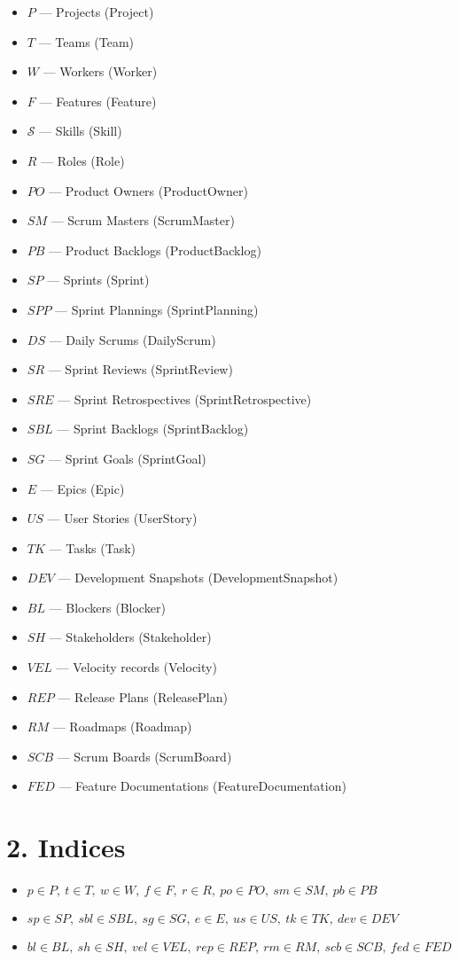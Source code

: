 \documentclass[11pt,a4paper]{article}
\begin{document}
\begin{itemize}
  \item $P$ — Projects (\textsf{Project})
  \item $T$ — Teams (\textsf{Team})
  \item $W$ — Workers (\textsf{Worker})
  \item $F$ — Features (\textsf{Feature})
  \item $\mathcal{S}$ — Skills (\textsf{Skill})
  \item $R$ — Roles (\textsf{Role})
  \item $PO$ — Product Owners (\textsf{ProductOwner})
  \item $SM$ — Scrum Masters (\textsf{ScrumMaster})
  \item $PB$ — Product Backlogs (\textsf{ProductBacklog})
  \item $SP$ — Sprints (\textsf{Sprint})
  \item $SPP$ — Sprint Plannings (\textsf{SprintPlanning})
  \item $DS$ — Daily Scrums (\textsf{DailyScrum})
  \item $SR$ — Sprint Reviews (\textsf{SprintReview})
  \item $SRE$ — Sprint Retrospectives (\textsf{SprintRetrospective})
  \item $SBL$ — Sprint Backlogs (\textsf{SprintBacklog})
  \item $SG$ — Sprint Goals (\textsf{SprintGoal})
  \item $E$ — Epics (\textsf{Epic})
  \item $US$ — User Stories (\textsf{UserStory})
  \item $TK$ — Tasks (\textsf{Task})
  \item $DEV$ — Development Snapshots (\textsf{DevelopmentSnapshot})
  \item $BL$ — Blockers (\textsf{Blocker})
  \item $SH$ — Stakeholders (\textsf{Stakeholder})
  \item $VEL$ — Velocity records (\textsf{Velocity})
  \item $REP$ — Release Plans (\textsf{ReleasePlan})
  \item $RM$ — Roadmaps (\textsf{Roadmap})
  \item $SCB$ — Scrum Boards (\textsf{ScrumBoard})
  \item $FED$ — Feature Documentations (\textsf{FeatureDocumentation})
\end{itemize}

\section{2. Indices}
\begin{itemize}
  \item $p\!\in\!P,\ t\!\in\!T,\ w\!\in\!W,\ f\!\in\!F,\ r\!\in\!R,\ po\!\in\!PO,\ sm\!\in\!SM,\ pb\!\in\!PB$
  \item $sp\!\in\!SP,\ sbl\!\in\!SBL,\ sg\!\in\!SG,\ e\!\in\!E,\ us\!\in\!US,\ tk\!\in\!TK,\ dev\!\in\!DEV$
  \item $bl\!\in\!BL,\ sh\!\in\!SH,\ vel\!\in\!VEL,\ rep\!\in\!REP,\ rm\!\in\!RM,\ scb\!\in\!SCB,\ fed\!\in\!FED$
\end{itemize}
\end{document}
